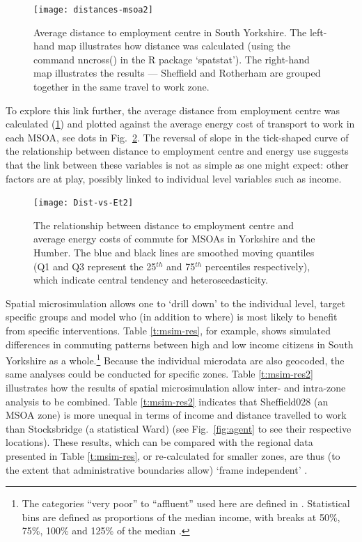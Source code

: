 \begin{figure}
\begin{center}
  \texttt{[image: distances-msoa2]}
\end{center}
\caption[Average distance to employment centre in South Yorkshire]{Average
distance to employment centre in South Yorkshire. The
left-hand map illustrates how distance was calculated (using the command
 nncross() in the R package `spatstat'). The right-hand map illustrates
the results --- Sheffield and Rotherham are grouped together in the same
travel to work zone.}
\label{fig:dis-msoa}
\end{figure}

To explore this link further, the average distance from employment
centre
was calculated (\ref{fig:dis-msoa})
and plotted against the average energy cost of transport to work in each MSOA,
see dots in Fig.~\ref{fig:dis-e}. The reversal of slope in the
tick-shaped curve of the relationship between distance to employment centre and
energy use suggests that the link between these variables is not as simple as
one might expect: other factors are at play, possibly linked to
individual level variables such as income.

\begin{figure}[h*]
 \centering
\texttt{[image: Dist-vs-Et2]}
 \caption[Scatter plot of distance vs energy costs in Yorkshire and the Humber]
 {The relationship between distance to employment centre and average
energy costs of commute for MSOAs in Yorkshire and the Humber. The blue and
black lines are smoothed moving quantiles (Q1 and Q3 represent the 25$^{th}$ and 75$^{th}$
percentiles respectively), which indicate central tendency and heteroscedasticity.}
 \label{fig:dis-e}
\end{figure}

Spatial microsimulation allows one to `drill down' to the individual
level, target specific groups and model who (in addition to where) is most
likely to benefit from specific interventions. Table \ref{t:msim-res}, for
example, shows simulated differences in commuting patterns between high
and low income citizens in South Yorkshire as a whole.\footnote{The categories
``very poor'' to ``affluent'' used here are defined in \citep{Ballas2005b}.
Statistical bins are defined as proportions of the median income, with
breaks at 50\%, 75\%, 100\% and 125\% of the median \citep[p.~91]{Ballas2005b}.}
Because the individual
microdata are also geocoded, the same analyses could be conducted for
specific zones.
Table \ref{t:msim-res2} illustrates how the results of spatial microsimulation
allow inter- and intra-zone analysis to be combined. Table \ref{t:msim-res2}
indicates that Sheffield028 (an MSOA zone) is more unequal in terms of
income and distance travelled to work than Stocksbridge (a statistical Ward)
(see Fig.~\ref{fig:agent} to see their respective locations).
These results, which can be compared with the regional data presented
in Table \ref{t:msim-res}, or re-calculated for smaller zones, are thus
(to the extent that administrative boundaries allow)
`frame independent' \citep{Horner2002}.

